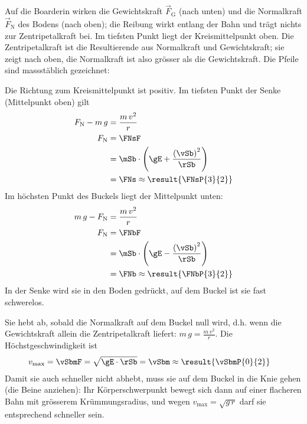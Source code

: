 \begin{abcliste}
\abc Auf die Boarderin wirken die Gewichtskraft $\vec F_\mathrm{G}$ (nach unten) und die Normalkraft $\vec F_\mathrm{N}$ des Bodens (nach oben); die Reibung wirkt entlang der Bahn und trägt nichts zur Zentripetalkraft bei. Im tiefsten Punkt liegt der Kreismittelpunkt oben. Die Zentripetalkraft ist die Resultierende aus Normalkraft und Gewichtskraft; sie zeigt nach oben, die Normalkraft ist also grösser als die Gewichtskraft. Die Pfeile sind massstäblich gezeichnet:

\begin{center}
\end{center}

\abc Die Richtung zum Kreismittelpunkt ist positiv. Im tiefsten Punkt der Senke (Mittelpunkt oben) gilt
\begin{align}
 F_\mathrm{N} - m\,g &= \frac{m\,v^2}{r} \\
 F_\mathrm{N} &= \FNsF \\
   &= \mSb\cdot\left(\gE+\frac{\left(\vSb\right)^2}{\rSb}\right) \\
   &= \FNs \approx \result{\FNsP{3}{2}}
\end{align}
Im höchsten Punkt des Buckels liegt der Mittelpunkt unten:
\begin{align}
 m\,g - F_\mathrm{N} &= \frac{m\,v^2}{r} \\
 F_\mathrm{N} &= \FNbF \\
   &= \mSb\cdot\left(\gE-\frac{\left(\vSb\right)^2}{\rSb}\right) \\
   &= \FNb \approx \result{\FNbP{3}{2}}
\end{align}
In der Senke wird sie in den Boden gedrückt, auf dem Buckel ist sie fast schwerelos.

\abc Sie hebt ab, sobald die Normalkraft auf dem Buckel null wird, d.h. wenn die Gewichtskraft allein die Zentripetalkraft liefert: $m\,g = \frac{m\,v^2}{r}$. Die Höchstgeschwindigkeit ist
\begin{align}
 v_\mathrm{max} &= \vSbmF = \sqrt{\gE\cdot\rSb} = \vSbm \approx \result{\vSbmP{0}{2}}
\end{align}
Damit sie auch schneller nicht abhebt, muss sie auf dem Buckel in die Knie gehen (die Beine anziehen): Ihr Körperschwerpunkt bewegt sich dann auf einer flacheren Bahn mit grösserem Krümmungsradius, und wegen $v_\mathrm{max} = \sqrt{g\,r}$ darf sie entsprechend schneller sein.
\end{abcliste}
